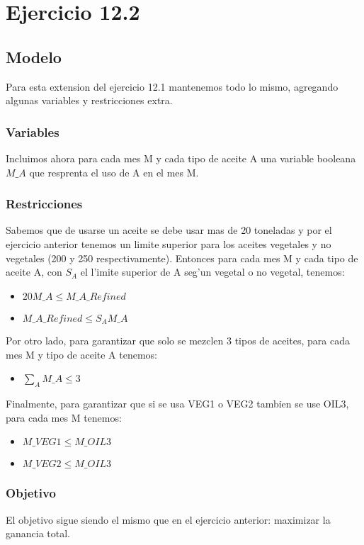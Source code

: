 \section{Ejercicio 12.2}
\subsection{Modelo}
Para esta extension del ejercicio 12.1 mantenemos todo lo mismo, agregando algunas variables y restricciones extra.
\subsubsection{Variables}
Incluimos ahora para cada mes M y cada tipo de aceite A una variable booleana $M\_A$ que resprenta el uso de A en el mes M.
\subsubsection{Restricciones}
Sabemos que de usarse un aceite se debe usar mas de 20 toneladas y por el ejercicio anterior tenemos un limite superior para los aceites vegetales y no vegetales (200 y 250 respectivamente). Entonces para cada mes M y cada tipo de aceite A, con $S_{A}$ el l'imite superior de A seg'un vegetal o no vegetal, tenemos:
\begin{itemize}
\item$20 M\_A \leq M\_A\_Refined$
\item$M\_A\_Refined \leq S_{A} M\_A$
\end{itemize}
Por otro lado, para garantizar que solo se mezclen 3 tipos de aceites, para cada mes M y tipo de aceite A tenemos:
\begin{itemize}
\item$\sum_{A} M\_A \leq 3$
\end{itemize}
Finalmente, para garantizar que si se usa VEG1 o VEG2 tambien se use OIL3, para cada mes M tenemos:
\begin{itemize}
\item$M\_VEG1 \leq M\_OIL3$
\item$M\_VEG2 \leq M\_OIL3$
\end{itemize}
\subsubsection{Objetivo}
El objetivo sigue siendo el mismo que en el ejercicio anterior: maximizar la ganancia total.

